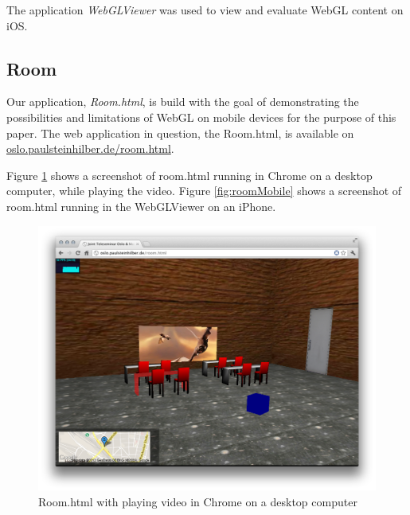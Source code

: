 \documentclass[12pt,journal,compsoc]{IEEEtran}
\begin{document}
The application \textit{WebGLViewer} was used to view and evaluate WebGL content on iOS.

\subsection{Room} \label{roomhtml}
Our application, \textit{Room.html}, is build with the goal of demonstrating the possibilities and limitations of WebGL on mobile devices for the purpose of this paper. The web application in question, the Room.html, is available on \url{oslo.paulsteinhilber.de/room.html}. 

Figure \ref{fig:roomVideo} shows a screenshot of room.html running in Chrome on a desktop computer, while playing the video. Figure \ref{fig:roomMobile} shows a screenshot of room.html running in the WebGLViewer on an iPhone.

\begin{figure}[htb]
	\includegraphics[width=\columnwidth]{grafiken/roomVideo}
	\caption{Room.html with playing video in Chrome on a desktop computer}
	\label{fig:roomVideo}
\end{figure}
\end{document}
